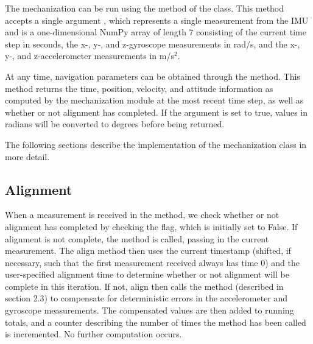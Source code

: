 \documentclass[11pt, oneside]{article}   	%
\begin{document}
The mechanization can be run using the  method of the  class.  This method accepts a single argument , which represents a single measurement from the IMU and is a one-dimensional NumPy array of length 7 consisting of the current time step in seconds, the x-, y-, and z-gyroscope measurements in rad/s, and the x-, y-, and z-accelerometer measurements in m/s$^2$.  

At any time, navigation parameters can be obtained through the  method.  This method returns the time, position, velocity, and attitude information as computed by the mechanization module at the most recent time step, as well as whether or not alignment has completed.  If the argument  is set to true, values in radians will be converted to degrees before being returned.

The following sections describe the implementation of the mechanization class in more detail.

\subsection{Alignment}
When a measurement is received in the  method, we check whether or not alignment has completed by checking the  flag, which is initially set to False.  If alignment is not complete, the  method is called, passing in the current measurement.  The align method then uses the current timestamp (shifted, if necessary, such that the first measurement received always has time 0) and the user-specified alignment time to determine whether or not alignment will be complete in this iteration.  If not, align then calls the  method (described in section 2.3) to compensate for deterministic errors in the accelerometer and gyroscope measurements.  The compensated values are then added to running totals, and a counter describing the number of times the  method has been called is incremented.  No further computation occurs.
\end{document}
